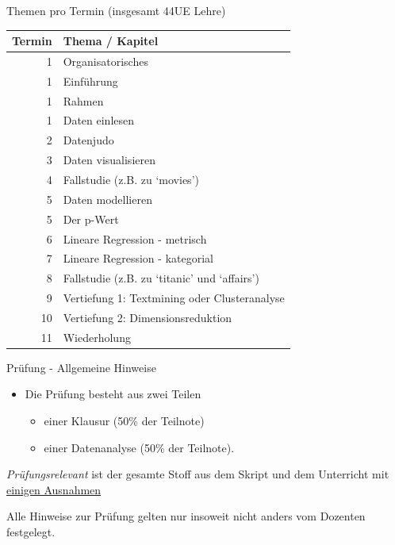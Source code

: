 \begin{frame}{Themen pro Termin (insgesamt 44UE Lehre)}

\footnotesize

\begin{longtable}[]{@{}rl@{}}
\toprule
Termin & Thema / Kapitel\tabularnewline
\midrule
\endhead
1 & Organisatorisches\tabularnewline
1 & Einführung\tabularnewline
1 & Rahmen\tabularnewline
1 & Daten einlesen\tabularnewline
2 & Datenjudo\tabularnewline
3 & Daten visualisieren\tabularnewline
4 & Fallstudie (z.B. zu `movies')\tabularnewline
5 & Daten modellieren\tabularnewline
5 & Der p-Wert\tabularnewline
6 & Lineare Regression - metrisch\tabularnewline
7 & Lineare Regression - kategorial\tabularnewline
8 & Fallstudie (z.B. zu `titanic' und `affairs')\tabularnewline
9 & Vertiefung 1: Textmining oder Clusteranalyse\tabularnewline
10 & Vertiefung 2: Dimensionsreduktion\tabularnewline
11 & Wiederholung\tabularnewline
\bottomrule
\end{longtable}

\end{frame}

\begin{frame}{Prüfung - Allgemeine Hinweise}

\begin{itemize}
\tightlist
\item
  Die Prüfung besteht aus zwei Teilen

  \begin{itemize}
  \tightlist
  \item
    einer Klausur (50\% der Teilnote)
  \item
    einer Datenanalyse (50\% der Teilnote).
  \end{itemize}
\end{itemize}

\emph{Prüfungsrelevant} ist der gesamte Stoff aus dem Skript und dem
Unterricht mit
\href{https://sebastiansauer.github.io/Praxis_der_Datenanalyse/organisatorisches.html\#prufung}{einigen
Ausnahmen}

Alle Hinweise zur Prüfung gelten nur insoweit nicht anders vom Dozenten
festgelegt.

\end{frame}

